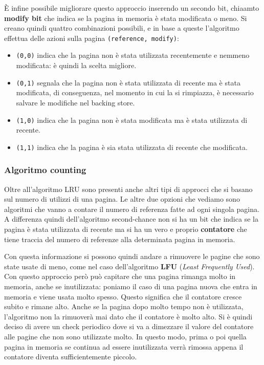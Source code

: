 È infine possibile migliorare questo approccio inserendo un secondo bit, chiaamto \textbf{modify bit} che indica se la pagina in memoria è stata modificata o meno. Si creano quindi quattro combinazioni possibili, e in base a queste l'algoritmo effettua delle azioni sulla pagina \texttt{(reference, modify)}:
\vspace{-4px}
\begin{itemize}
\setlength{\itemsep}{-1px}
    \item\texttt{(0,0)} indica che la pagina non è stata utilizzata recentemente e nemmeno modificata: è quindi la scelta migliore.
    \item\texttt{(0,1)} segnala che la pagina non è stata utilizzata di recente ma è stata modificata, di conseguenza, nel momento in cui la si rimpiazza, è necessario salvare le modifiche nel backing store.
    \item\texttt{(1,0)} indica che la pagina non è stata modificata ma è stata utilizzata di recente.
    \item\texttt{(1,1)} indica che la pagina è sia stata utilizzata di recente che modificata.
\end{itemize}

% 
\subsubsection{Algoritmo counting}
Oltre all'algoritmo LRU sono presenti anche altri tipi di approcci che si basano sul numero di utilizzi di una pagina. Le altre due opzioni che vediamo sono algoritmi che vanno a contare il numero di referenza fatte ad ogni singola pagina. A differenza quindi dell'algoritmo second-chance non si ha un bit che indica se la pagina è stata utilizzata di recente ma si ha un vero e proprio \textbf{contatore} che tiene traccia del numero di referenze alla determinata pagina in memoria.

Con questa informazione si possono quindi andare a rimuovere le pagine che sono state usate di meno, come nel caso dell'algoritmo \textbf{LFU} (\textit{Least Frequently Used}). Con questo approccio però può capitare che una pagina rimanga molto in memoria, anche se inutilizzata: poniamo il caso di una pagina nuova che entra in memoria e viene usata molto spesso. Questo significa che il contatore cresce subito e rimane alto. Anche se la pagina dopo molto tempo non è utilizzata, l'algoritmo non la rimuoverà mai dato che il contatore è molto alto. Si è quindi deciso di avere un check periodico dove si va a dimezzare il valore del contatore alle pagine che non sono utilizzate molto. In questo modo, prima o poi quella pagina in memoria se continua ad essere inutilizzata verrà rimossa appena il contatore diventa sufficientemente piccolo.

